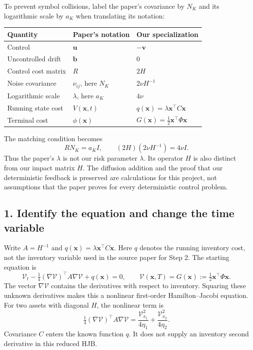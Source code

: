 To prevent symbol collisions, label the paper's covariance by $N_K$
and its logarithmic scale by $a_K$ when translating its notation:
\begin{center}
\begin{tabular}{lll}
Quantity & Paper's notation & Our specialization\\\hline
Control & $\mathbf u$ & $-\mathbf v$\\
Uncontrolled drift & $\mathbf b$ & $0$\\
Control cost matrix & $R$ & $2H$\\
Noise covariance & $\nu_{ij}$, here $N_K$ & $2\nu H^{-1}$\\
Logarithmic scale & $\lambda$, here $a_K$ & $4\nu$\\
Running state cost & $V(\mathbf x,t)$ & $q(\mathbf x)=\lambda\mathbf x^\top C\mathbf x$\\
Terminal cost & $\phi(\mathbf x)$ & $G(\mathbf x)=\tfrac12\mathbf x^\top\Phi\mathbf x$
\end{tabular}
\end{center}
The matching condition becomes
\begin{equation}
 R N_K=a_K I,\qquad
 (2H)(2\nu H^{-1})=4\nu I.
 \label{eq:stage4-paper-map}
\end{equation}
Thus the paper's $\lambda$ is not our risk parameter $\lambda$.
Its operator $H$ is also distinct from our impact matrix $H$.
The diffusion addition and the proof that our deterministic feedback is
preserved are calculations for this project, not assumptions that the
paper proves for every deterministic control problem.

\subsection*{1. Identify the equation and change the time variable}

Write $A=H^{-1}$ and $q(\mathbf x)=\lambda\mathbf x^\top C\mathbf x$.
Here $q$ denotes the running inventory cost, not the inventory variable
used in the source paper for Step 2. The starting equation is
\begin{equation}
 \mathcal V_t-\tfrac14(\nabla\mathcal V)^\top A\nabla\mathcal V
 +q(\mathbf x)=0,\qquad
 \mathcal V(\mathbf x,T)=G(\mathbf x)
 :=\tfrac12\mathbf x^\top\Phi\mathbf x.
 \label{eq:stage4-original}
\end{equation}
The vector $\nabla\mathcal V$ contains the derivatives with respect to
inventory. Squaring these unknown derivatives makes this a nonlinear
first-order Hamilton--Jacobi equation. For two assets with diagonal $H$,
the nonlinear term is
\[
 \tfrac14(\nabla\mathcal V)^\top A\nabla\mathcal V
 =\frac{\mathcal V_{x_1}^2}{4\eta_1}
 +\frac{\mathcal V_{x_2}^2}{4\eta_2}.
\]
Covariance $C$ enters the known function $q$. It does not supply an
inventory second derivative in this reduced HJB.

